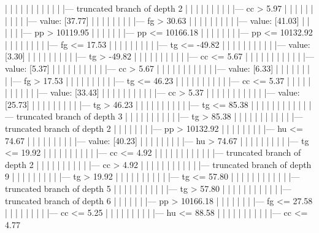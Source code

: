 \documentclass[UTF8, a4paper]{ctexart}
\begin{document}
|   |   |   |   |   |   |   |   |   |   |   |--- truncated branch of depth 2
|   |   |   |   |   |   |   |   |   |--- cc >  5.97
|   |   |   |   |   |   |   |   |   |   |--- value: [37.77]
|   |   |   |   |   |   |   |   |--- fg >  30.63
|   |   |   |   |   |   |   |   |   |--- value: [41.03]
|   |   |   |   |   |--- pp >  10119.95
|   |   |   |   |   |   |--- pp <= 10166.18
|   |   |   |   |   |   |   |--- pp <= 10132.92
|   |   |   |   |   |   |   |   |--- fg <= 17.53
|   |   |   |   |   |   |   |   |   |--- tg <= -49.82
|   |   |   |   |   |   |   |   |   |   |--- value: [3.30]
|   |   |   |   |   |   |   |   |   |--- tg >  -49.82
|   |   |   |   |   |   |   |   |   |   |--- cc <= 5.67
|   |   |   |   |   |   |   |   |   |   |   |--- value: [5.37]
|   |   |   |   |   |   |   |   |   |   |--- cc >  5.67
|   |   |   |   |   |   |   |   |   |   |   |--- value: [6.33]
|   |   |   |   |   |   |   |   |--- fg >  17.53
|   |   |   |   |   |   |   |   |   |--- tg <= 46.23
|   |   |   |   |   |   |   |   |   |   |--- cc <= 5.37
|   |   |   |   |   |   |   |   |   |   |   |--- value: [33.43]
|   |   |   |   |   |   |   |   |   |   |--- cc >  5.37
|   |   |   |   |   |   |   |   |   |   |   |--- value: [25.73]
|   |   |   |   |   |   |   |   |   |--- tg >  46.23
|   |   |   |   |   |   |   |   |   |   |--- tg <= 85.38
|   |   |   |   |   |   |   |   |   |   |   |--- truncated branch of depth 3
|   |   |   |   |   |   |   |   |   |   |--- tg >  85.38
|   |   |   |   |   |   |   |   |   |   |   |--- truncated branch of depth 2
|   |   |   |   |   |   |   |--- pp >  10132.92
|   |   |   |   |   |   |   |   |--- hu <= 74.67
|   |   |   |   |   |   |   |   |   |--- value: [40.23]
|   |   |   |   |   |   |   |   |--- hu >  74.67
|   |   |   |   |   |   |   |   |   |--- tg <= 19.92
|   |   |   |   |   |   |   |   |   |   |--- cc <= 4.92
|   |   |   |   |   |   |   |   |   |   |   |--- truncated branch of depth 2
|   |   |   |   |   |   |   |   |   |   |--- cc >  4.92
|   |   |   |   |   |   |   |   |   |   |   |--- truncated branch of depth 9
|   |   |   |   |   |   |   |   |   |--- tg >  19.92
|   |   |   |   |   |   |   |   |   |   |--- tg <= 57.80
|   |   |   |   |   |   |   |   |   |   |   |--- truncated branch of depth 5
|   |   |   |   |   |   |   |   |   |   |--- tg >  57.80
|   |   |   |   |   |   |   |   |   |   |   |--- truncated branch of depth 6
|   |   |   |   |   |   |--- pp >  10166.18
|   |   |   |   |   |   |   |--- fg <= 27.58
|   |   |   |   |   |   |   |   |--- cc <= 5.25
|   |   |   |   |   |   |   |   |   |--- hu <= 88.58
|   |   |   |   |   |   |   |   |   |   |--- cc <= 4.77
\end{document}
